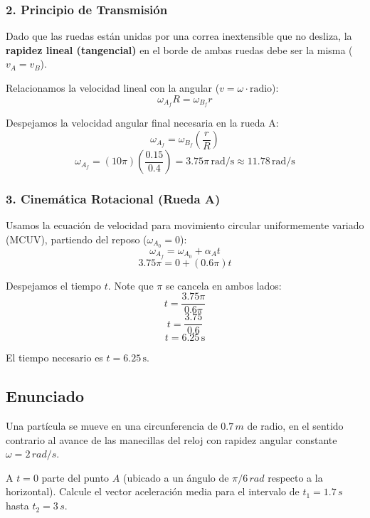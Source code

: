 \documentclass[12pt, a4paper]{article}
\begin{document}
\subsubsection*{2. Principio de Transmisión}
Dado que las ruedas están unidas por una correa inextensible que no desliza, la \textbf{rapidez lineal (tangencial)} en el borde de ambas ruedas debe ser la misma ($v_A = v_B$).

Relacionamos la velocidad lineal con la angular ($v = \omega \cdot \text{radio}$):
$$ \omega_{A_f} R = \omega_{B_f} r $$

Despejamos la velocidad angular final necesaria en la rueda A:
$$ \omega_{A_f} = \omega_{B_f} \left( \frac{r}{R} \right) $$
$$ \omega_{A_f} = (10\pi) \left( \frac{0.15}{0.4} \right) = 3.75\pi \, \text{rad/s} \approx 11.78 \, \text{rad/s} $$

\subsubsection*{3. Cinemática Rotacional (Rueda A)}
Usamos la ecuación de velocidad para movimiento circular uniformemente variado (MCUV), partiendo del reposo ($\omega_{A_0} = 0$):
$$ \omega_{A_f} = \omega_{A_0} + \alpha_A t $$
$$ 3.75\pi = 0 + (0.6\pi) t $$

Despejamos el tiempo $t$. Note que $\pi$ se cancela en ambos lados:
$$ t = \frac{3.75\pi}{0.6\pi} $$
$$ t = \frac{3.75}{0.6} $$
$$ \boxed{t = 6.25 \, \text{s}} $$

\begin{tcolorbox}[colback=blue!5!white, colframe=blue!75!black, title=Respuesta Final]
\centering
El tiempo necesario es $t = 6.25 \, \text{s}$.
\end{tcolorbox}

\newpage

\subsection*{Enunciado}
Una partícula se mueve en una circunferencia de $0.7 \, \si{m}$ de radio, en el sentido contrario al avance de las manecillas del reloj con rapidez angular constante $\omega = 2 \, \si{rad/s}$.

A $t = 0$ parte del punto $A$ (ubicado a un ángulo de $\pi/6 \, \si{rad}$ respecto a la horizontal). Calcule el vector aceleración media para el intervalo de $t_1 = 1.7 \, \si{s}$ hasta $t_2 = 3 \, \si{s}$.
\end{document}
